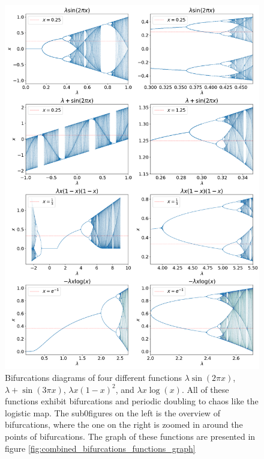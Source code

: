 \begin{figure}
	\centering
	\includegraphics[width=\textwidth]{./figures/combined_bifurcations.png}
	\caption{
		Bifurcations diagrams of four different functions 
		$ \lambda \sin(2\pi x)$,
		$ \lambda + \sin(3\pi x)$,
		$ \lambda x(1-x)^2$,
		and $ \lambda x \log(x)$.
		All of these functions exhibit bifurcations and periodic doubling to chaos like the logistic map. 
		The sub0figures on the left is the overview of bifurcations, where the one on the right is zoomed in around the points of bifurcations.
		The graph of these functions are presented in figure \ref{fig:combined_bifurcations_functions_graph}
	}
	\label{fig:combined_bifurcations}
\end{figure}


